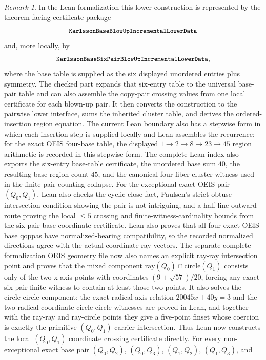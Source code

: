 \documentclass[12pt]{article}
\theoremstyle{plain}
\theoremstyle{definition}
\theoremstyle{remark}
\newtheorem{remark}[theorem]{Remark}
\begin{document}
\begin{remark}
In the Lean formalization this lower construction is represented by the
theorem-facing certificate package
\[
  {\small\texttt{KarlssonBaseBlowUpIncrementalLowerData}}
\]
and, more locally, by
\[
  {\small\texttt{KarlssonBaseSixPairBlowUpIncrementalLowerData}},
\]
where the base table is supplied as the six displayed unordered entries plus
symmetry.  The checked part expands that six-entry table to the universal
base-pair table and can also assemble the copy-pair crossing values from one
local certificate for each blown-up pair.  It then converts the construction
to the pairwise lower interface, sums the inherited cluster table, and derives
the ordered-insertion region equation.  The current Lean boundary also has a
stepwise form in which each insertion step is supplied locally and Lean
assembles the recurrence; for the exact OEIS four-base table, the displayed
\(1\to2\to8\to23\to45\) region arithmetic is recorded in this stepwise form.
The complete Lean index also exports the six-entry base-table certificate, the
unordered base sum \(40\), the resulting base region count \(45\), and the
canonical four-fiber cluster witness used in the finite pair-counting collapse.
For the exceptional exact OEIS pair \((Q_0,Q_1)\), Lean also checks the
cyclic-close fact, Paulsen's strict obtuse-intersection condition showing the
pair is not intriguing, and a half-line-outward route proving the local
\(\le 5\) crossing and finite-witness-cardinality bounds from the six-pair
base-coordinate certificate.  Lean also proves that all four exact OEIS base
qoppas have normalized-bearing compatibility, so the recorded normalized
directions agree with the actual coordinate ray vectors.  The separate
complete-formalization OEIS
geometry file now also names an explicit ray-ray intersection point and proves
that the mixed component \(\mathrm{ray}(Q_0)\cap\mathrm{circle}(Q_1)\) consists
only of the two x-axis points with coordinates \((9\pm\sqrt{57})/20\), forcing
any exact six-pair finite witness to contain at least those two points.  It
also solves the circle-circle component: the exact radical-axis
relation \(20045x+40y=3\) and the two radical-coordinate circle-circle
witnesses are proved in Lean, and together with the ray-ray and ray-circle
points they give a five-point finset whose coercion is exactly the primitive
\((Q_0,Q_1)\) carrier intersection.  Thus Lean now constructs the local
\((Q_0,Q_1)\) coordinate crossing certificate directly.  For every
non-exceptional exact base pair
\((Q_0,Q_2)\), \((Q_0,Q_3)\), \((Q_1,Q_2)\), \((Q_1,Q_3)\), and

\end{remark}
\end{document}
